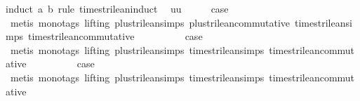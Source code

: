 \begin{isabellebody}
%
\isadelimproof
%
\endisadelimproof
%
\isatagproof
{}\isamarkupfalse%
{\isacharparenleft}induct\ a\ b\ rule{\isacharcolon}\ times{\isacharunderscore}trilean{\isachardot}induct{\isacharparenright}\isanewline
{}\isamarkupfalse%
\ {\isacharparenleft}{}\ uu{\isacharparenright}\isanewline
\ \ \isamarkupfalse%
\ \isamarkupfalse%
\ {\isacharquery}case\isanewline
\ \ \ \ \isamarkupfalse%
\ {\isacharparenleft}metis\ {\isacharparenleft}mono{\isacharunderscore}tags{\isacharcomma}\ lifting{\isacharparenright}\ plus{\isacharunderscore}trilean{\isachardot}simps{\isacharparenleft}{}{\isacharparenright}\ plus{\isacharunderscore}trilean{\isacharunderscore}commutative\ times{\isacharunderscore}trilean{\isachardot}simps{\isacharparenleft}{}{\isacharparenright}\ times{\isacharunderscore}trilean{\isacharunderscore}commutative{\isacharparenright}\isanewline
{}\isamarkupfalse%
\isanewline
\ \ \isamarkupfalse%
\ {\isachardoublequoteopen}{}{\isacharunderscore}{}{\isachardoublequoteclose}\isanewline
\ \ \isamarkupfalse%
\ \isamarkupfalse%
\ {\isacharquery}case\isanewline
\ \ \ \ \isamarkupfalse%
\ {\isacharparenleft}metis\ {\isacharparenleft}mono{\isacharunderscore}tags{\isacharcomma}\ lifting{\isacharparenright}\ plus{\isacharunderscore}trilean{\isachardot}simps{\isacharparenleft}{}{\isacharparenright}\ times{\isacharunderscore}trilean{\isachardot}simps{\isacharparenleft}{}{\isacharparenright}\ times{\isacharunderscore}trilean{\isacharunderscore}commutative{\isacharparenright}\isanewline
{}\isamarkupfalse%
\isanewline
\ \ \isamarkupfalse%
\ {\isachardoublequoteopen}{}{\isacharunderscore}{}{\isachardoublequoteclose}\isanewline
\ \ \isamarkupfalse%
\ \isamarkupfalse%
\ {\isacharquery}case\isanewline
\ \ \ \ \isamarkupfalse%
\ {\isacharparenleft}metis\ {\isacharparenleft}mono{\isacharunderscore}tags{\isacharcomma}\ lifting{\isacharparenright}\ plus{\isacharunderscore}trilean{\isachardot}simps{\isacharparenleft}{}{\isacharparenright}\ times{\isacharunderscore}trilean{\isachardot}simps{\isacharparenleft}{}{\isacharparenright}\ times{\isacharunderscore}trilean{\isacharunderscore}commutative{\isacharparenright}\isanewline
{}\isamarkupfalse%
\isanewline
\ \ \isamarkupfalse%
\ {}\isanewline

\end{isabellebody}
